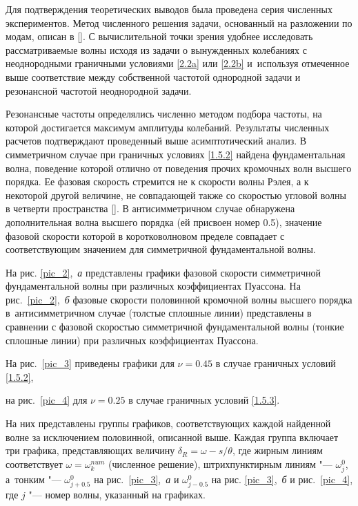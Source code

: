 
Для подтверждения теоретических выводов была проведена серия численных экспериментов. Метод численного решения задачи, основанный на разложении по модам, описан в []. С вычислительной точки зрения удобнее исследовать рассматриваемые волны исходя из задачи о вынужденных колебаниях с неоднородными граничными условиями \eqref{2.2a} или \eqref{2.2b} и~используя отмеченное выше соответствие между собственной частотой однородной задачи и резонансной частотой неоднородной задачи. 

Резонансные частоты определялись численно методом подбора частоты, на которой достигается максимум амплитуды колебаний. Результаты численных расчетов подтверждают проведенный выше асимптотический анализ. В симметричном случае при граничных условиях \eqref{1.5.2} найдена фундаментальная волна, поведение которой отлично от поведения прочих кромочных волн высшего порядка. Ее фазовая скорость стремится не к скорости волны Рэлея, а к некоторой другой величине, не совпадающей также со скоростью угловой волны в четверти пространства []. В антисимметричном случае обнаружена дополнительная волна высшего порядка (ей присвоен номер 0.5), значение фазовой скорости которой в коротковолновом пределе совпадает с соответствующим значением для симметричной фундаментальной волны.



На рис. \ref{pic_2},~{\sl а} представлены графики фазовой скорости симметричной фундаментальной волны при различных коэффициентах Пуассона. На рис.~\ref{pic_2},~{\sl б} фазовые скорости половинной кромочной волны высшего порядка в~антисимметричном случае (толстые сплошные линии) представлены в сравнении с фазовой скоростью симметричной фундаментальной волны (тонкие сплошные линии) при различных коэффициентах Пуассона.



На рис.~\ref{pic_3} приведены графики для $\nu=0.45$ в случае граничных условий \eqref{1.5.2}, 

на рис.~\ref{pic_4} для $\nu=0.25$ в случае граничных условий \eqref{1.5.3}. 

На них представлены группы графиков, соответствующих каждой найденной волне за исключением половинной, описанной выше. Каждая группа включает три графика, представляющих величину $\delta_R=\omega-{s}/{\theta}$, где жирным линиям соответствует $\omega=\omega_k^{num}$ (численное решение), штрихпунктирным линиям "--- $\omega_j^{0}$, а~тонким "--- $\omega_{j+0.5}^{0}$ на рис.~\ref{pic_3},~{\sl а} и $\omega_{j-0.5}^{0}$ на рис. \ref{pic_3},~{\sl б} и рис.~\ref{pic_4}, где $j$ "--- номер волны, указанный на графиках.







